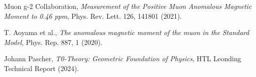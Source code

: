 \documentclass[12pt,a4paper]{article}
\begin{document}
	\begin{thebibliography}{9}
		
		Muon g-2 Collaboration,
		\textit{Measurement of the Positive Muon Anomalous Magnetic Moment to 0.46 ppm},
		Phys. Rev. Lett. 126, 141801 (2021).
		
		T. Aoyama et al.,
		\textit{The anomalous magnetic moment of the muon in the Standard Model},
		Phys. Rep. 887, 1 (2020).
		
		Johann Pascher,
		\textit{T0-Theory: Geometric Foundation of Physics},
		HTL Leonding Technical Report (2024).
		
	\end{thebibliography}
	
\end{document}
